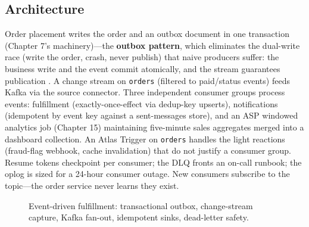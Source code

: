 \subsection{Architecture}
Order placement writes the order and an outbox document in one transaction (Chapter 7's machinery)---the \textbf{outbox pattern}, which eliminates the dual-write race (write the order, crash, never publish) that naive producers suffer: the business write and the event commit atomically, and the stream guarantees publication \cite{kleppmann2017ddia}. A change stream on \texttt{orders} (filtered to paid/status events) feeds Kafka via the source connector. Three independent consumer groups process events: fulfillment (exactly-once-effect via dedup-key upserts), notifications (idempotent by event key against a sent-messages store), and an ASP windowed analytics job (Chapter 15) maintaining five-minute sales aggregates merged into a dashboard collection. An Atlas Trigger on \texttt{orders} handles the light reactions (fraud-flag webhook, cache invalidation) that do not justify a consumer group. Resume tokens checkpoint per consumer; the DLQ fronts an on-call runbook; the oplog is sized for a 24-hour consumer outage. New consumers subscribe to the topic---the order service never learns they exist.

\begin{figure}[H]
    \centering
    \caption{Event-driven fulfillment: transactional outbox, change-stream capture, Kafka fan-out, idempotent sinks, dead-letter safety.}
    \label{fig:ch15-fulfillment}
\end{figure}

